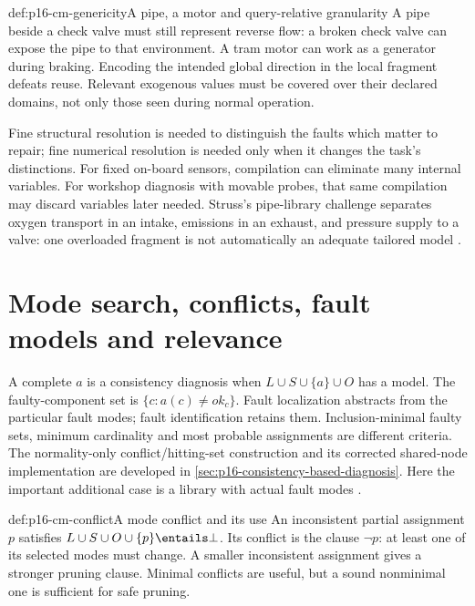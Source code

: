\begin{hbexample}{def:p16-cm-genericity}{A pipe, a motor and query-relative granularity}
A pipe beside a check valve must still represent reverse flow: a broken
check valve can expose the pipe to that environment. A tram motor can work
as a generator during braking. Encoding the intended global direction in
the local fragment defeats reuse. Relevant exogenous values must be covered
over their declared domains, not only those seen during normal operation.

Fine structural resolution is needed to distinguish the faults which matter
to repair; fine numerical resolution is needed only when it changes the
task's distinctions. For fixed on-board sensors, compilation can eliminate
many internal variables. For workshop diagnosis with movable probes, that
same compilation may discard variables later needed. Struss's pipe-library
challenge separates oxygen transport in an intake, emissions in an exhaust,
and pressure supply to a valve: one overloaded fragment is not automatically
an adequate tailored model \cite[pp.~406--407,459]{Struss2008ModelBasedProblemSolving}.
\end{hbexample}

\section{Mode search, conflicts, fault models and relevance}
\label{sec:p16-cm-mode-search}

A complete \(a\) is a consistency diagnosis when \(L\cup S\cup\{a\}
\cup O\) has a model. The faulty-component set is
\(\{c:a(c)\ne ok_c\}\). Fault localization abstracts from the particular
fault modes; fault identification retains them. Inclusion-minimal faulty sets,
minimum cardinality and most probable assignments are different criteria.
The normality-only conflict/hitting-set construction and its corrected
shared-node implementation are developed in
\cref{sec:p16-consistency-based-diagnosis}. Here the important additional
case is a library with actual fault modes
\cite[secs.~10.4.1--10.4.2]{Struss2008ModelBasedProblemSolving}.

\begin{hbdefinition}{def:p16-cm-conflict}{A mode conflict and its use}
An inconsistent partial assignment \(p\) satisfies
\(L\cup S\cup O\cup\{p\}\entails\bot\). Its conflict is the
clause \(\neg p\): at least one of its selected modes must change.
A smaller inconsistent assignment gives a stronger pruning clause. Minimal
conflicts are useful, but a sound nonminimal one is sufficient for safe pruning.
\end{hbdefinition}

